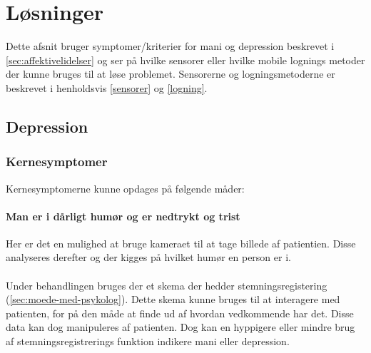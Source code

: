 \section{Løsninger}
Dette afsnit bruger symptomer/kriterier for mani og depression beskrevet i \cref{sec:affektivelidelser} og ser på hvilke sensorer eller hvilke mobile lognings metoder der kunne bruges til at løse problemet.
Sensorerne og logningsmetoderne er beskrevet i henholdsvis \cref{sensorer} og \cref{logning}.

\subsection{Depression}

\subsubsection{Kernesymptomer}
Kernesymptomerne kunne opdages på følgende måder:

\paragraph{Man er i dårligt humør og er nedtrykt og trist}\label{darligthumor}
Her er det en mulighed at bruge kameraet til at tage billede af patientien. Disse analyseres derefter og der kigges på hvilket humør en person er i.

\paragraph{}
\noindent 
Under behandlingen bruges der et skema der hedder stemningsregistering (\cref{sec:moede-med-psykolog}). Dette skema kunne bruges til at interagere med patienten, for på den måde at finde ud af hvordan vedkommende har det. Disse data kan dog manipuleres af patienten. Dog kan en hyppigere eller mindre brug af stemningsregistrerings funktion indikere mani eller depression.

